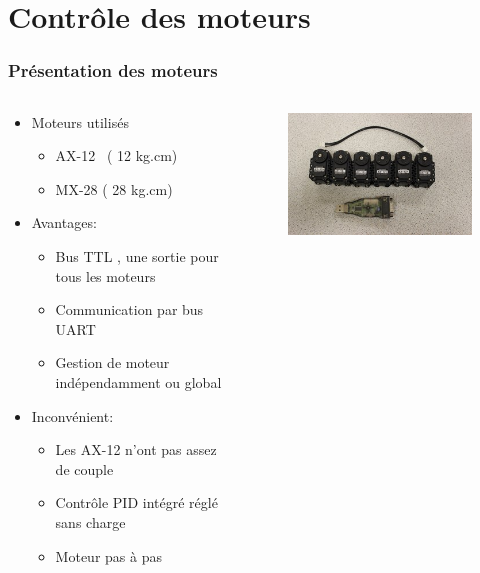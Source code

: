 \section{Contrôle des moteurs}
\begin{frame}
  \frametitle{Présentation des moteurs}
  \begin{columns}[T]
    \begin{column}{.65\textwidth}
           \begin{itemize}
            \item Moteurs utilisés 
            \begin{itemize}
              \item AX-12~ ( 12 kg.cm)
              \item MX-28 ( 28 kg.cm)
            \end{itemize}
            \item Avantages:
            \begin{itemize}
              \item Bus TTL , une sortie pour tous les moteurs
              \item Communication par bus UART
              \item Gestion de moteur indépendamment ou global
            \end{itemize}
          \item Inconvénient:
            \begin{itemize}
              \item Les AX-12 n'ont pas assez de couple
              \item Contrôle PID intégré réglé sans charge
              \item Moteur pas à pas
            \end{itemize}
          \end{itemize}
        \end{column}
        \begin{column}{.3\textwidth}
          \begin{figure}[ht]
            \centering
            \includegraphics[scale= 0.35]{../img/AX12+USB_2_DynamicCell.JPG}
          \end{figure}
        \end{column}
      \end{columns}

\end{frame}

